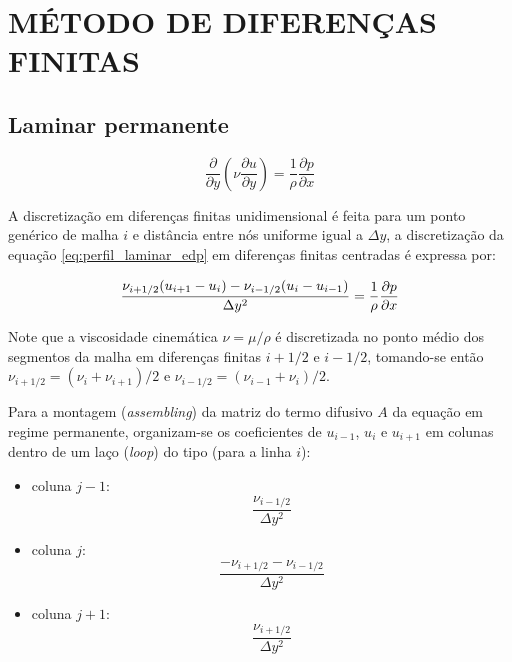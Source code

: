 \typeout{ ====================================================================}
\typeout{ ====================================================================}

\section{MÉTODO DE DIFERENÇAS FINITAS}

\subsection{Laminar permanente}

\begin{equation}
	\frac{\partial}{\partial y} \left(\nu \frac{\partial u}{\partial y}\right)
	=
	\frac{1}{\rho} \frac{\partial p}{\partial x}
\end{equation}

A discretização em diferenças finitas unidimensional é feita para um
ponto genérico de malha $i$ e distância entre nós uniforme igual a
$\Delta y$, a discretização da equação \ref{eq:perfil_laminar_edp} em
diferenças finitas centradas é expressa por:

\begin{eqnarray}
	\frac{\nu_{i+1/2}(u_{i+1}-u_{i})
	-
	\nu_{i-1/2}(u_{i}-u_{i-1})}{\Delta y^2} 
	=
	\frac{1}{\rho}\frac{\partial p}{\partial x} 
\label{eq:perfil_laminar_discr}
\end{eqnarray}

Note que a viscosidade cinemática $\nu = \mu / \rho$ é discretizada no
ponto médio dos segmentos da malha em diferenças finitas $i+1/2$ e
$i-1/2$, tomando-se então $\nu_{i+1/2} = (\nu_{i}+\nu_{i+1})/2$ e
$\nu_{i-1/2} = (\nu_{i-1}+\nu_{i})/2$.

Para a montagem (\emph{assembling}) da matriz do termo difusivo $A$ da
equação em regime permanente, organizam-se os coeficientes de $u_{i-1}$, $u_i$ e
$u_{i+1}$ em colunas %
dentro de um laço (\emph{loop}) do tipo (para a linha $i$):

\begin{itemize}
	\item{coluna $j-1$:}
		\begin{equation}
			\frac{\nu_{i-1/2}}{\Delta y^2}
		\end{equation}
	\item{coluna $j$:}
		\begin{equation}
			\frac{-\nu_{i+1/2}-\nu_{i-1/2}}{\Delta y^2}
		\end{equation}
	\item{coluna $j+1$:}
		\begin{equation}
			\frac{\nu_{i+1/2}}{\Delta y^2}
		\end{equation}
\end{itemize}

